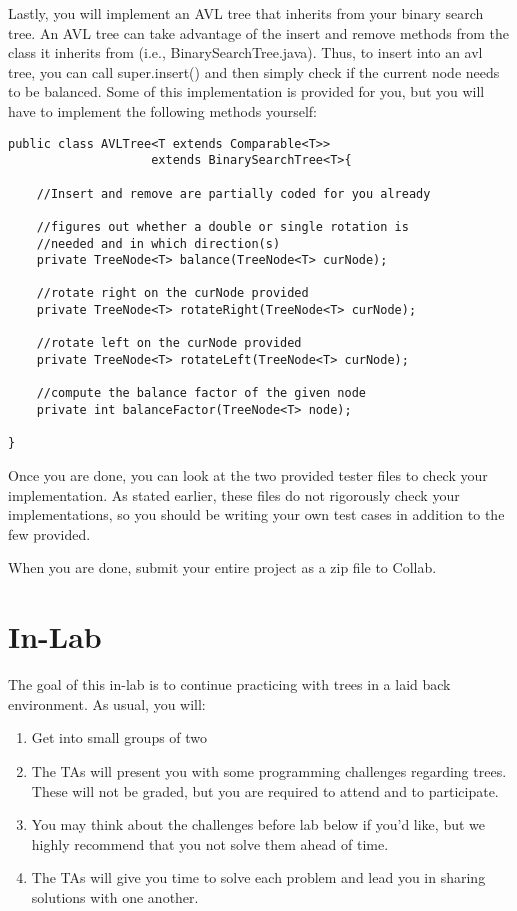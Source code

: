 \documentclass[paper=a4, fontsize=11pt, parskip=full]{scrartcl} %
\numberwithin{equation}{section} %
\numberwithin{figure}{section} %
\numberwithin{table}{section} %
\begin{document}
Lastly, you will implement an AVL tree that inherits from your binary search tree. An AVL tree can take advantage of the insert and remove methods from the class it inherits from (i.e., BinarySearchTree.java). Thus, to insert into an avl tree, you can call super.insert() and then simply check if the current node needs to be balanced. Some of this implementation is provided for you, but you will have to implement the following methods yourself:

\begin{lstlisting}
public class AVLTree<T extends Comparable<T>>
					extends BinarySearchTree<T>{

	//Insert and remove are partially coded for you already

	//figures out whether a double or single rotation is
	//needed and in which direction(s)
	private TreeNode<T> balance(TreeNode<T> curNode);
			
	//rotate right on the curNode provided
	private TreeNode<T> rotateRight(TreeNode<T> curNode);
	
	//rotate left on the curNode provided
	private TreeNode<T> rotateLeft(TreeNode<T> curNode);
	
	//compute the balance factor of the given node
	private int balanceFactor(TreeNode<T> node);

}
\end{lstlisting}

Once you are done, you can look at the two provided tester files to check your implementation. As stated earlier, these files do not rigorously check your implementations, so you should be writing your own test cases in addition to the few provided.

When you are done, submit your entire project as a zip file to Collab.



\newpage
\section{In-Lab}

The goal of this in-lab is to continue practicing with trees in a laid back environment. As usual, you will:

\begin{enumerate}
	\item Get into small groups of two
	\item The TAs will present you with some programming challenges regarding trees. These will not be graded, but you are required to attend and to participate.
	\item You may think about the challenges before lab below if you'd like, but we highly recommend that you not solve them ahead of time.
	\item The TAs will give you time to solve each problem and lead you in sharing solutions with one another.
\end{enumerate}
\end{document}
